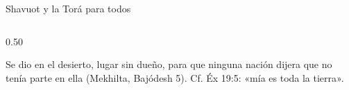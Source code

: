 \begin{frame}{Shavuot y la Torá para todos}
\begin{columns}[T,onlytextwidth]
\begin{column}{0.50\textwidth}
\vspace{2pt}
\begin{clave}Se dio en el desierto, lugar sin dueño, para que ninguna nación dijera que no tenía parte en ella (Mekhilta, Bajódesh 5). Cf. Éx 19:5: «mía es toda la tierra».\end{clave}
\end{column}
\end{columns}
\end{frame}

